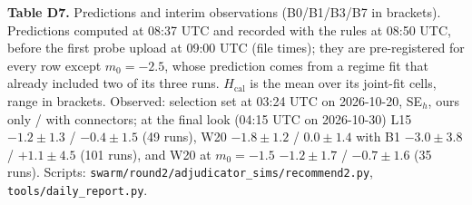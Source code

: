 \documentclass[
]{article}
\begin{document}
\textbf{Table D7.} Predictions and interim observations (B0/B1/B3/B7 in
brackets). Predictions computed at 08:37 UTC and recorded with the rules
at 08:50 UTC, before the first probe upload at 09:00 UTC (file times);
they are pre-registered for every row except \(m_0 = -2.5\), whose
prediction comes from a regime fit that already included two of its
three runs. \(H_{\mathrm{cal}}\) is the mean over its joint-fit cells,
range in brackets. Observed: selection set at 03:24 UTC on 2026-10-20,
SE\(_h\), ours only / with connectors; at the final look (04:15 UTC on
2026-10-30) L15 \(-1.2 \pm 1.3\) / \(-0.4 \pm 1.5\) (49 runs), W20
\(-1.8 \pm 1.2\) / \(0.0 \pm 1.4\) with B1 \(-3.0 \pm 3.8\) /
\(+1.1 \pm 4.5\) (101 runs), and W20 at \(m_0 = -1.5\) \(-1.2 \pm 1.7\)
/ \(-0.7 \pm 1.6\) (35 runs). Scripts:
\texttt{swarm/round2/adjudicator\_sims/recommend2.py},
\texttt{tools/daily\_report.py}.
\end{document}
